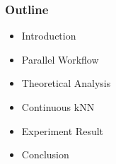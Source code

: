 \begin{comment}
\begin{frame}
\frametitle{DRDS --- Advanced Method --- Naive Bayes Partitioning}
We consider the n partitions from $N_1$ to $N_n$ as n different classes and the already partitioned data as training set. 
The probability that a new point $x$ belongs to $N_i$ is:
\begin{equation}
P(N_i | x) = \frac{P(x | N_i) \cdot P(N_i)}{P(x)}
\end{equation}

And $x$ should be assigned to the partition $N_y$ which has the biggest probability:
\begin{equation}
x \in N_y, \  where \ P(N_y|x) = max\{P(N_1|x), P(N_2|x), ..., P(N_n|x)\}
\end{equation}
\end{frame}

\begin{frame}
\frametitle{Naive Bayes Partitioning}
Partitioning Problem = The calculation of $P(N_i|x)$
\begin{equation}
P(N_i|x) = P(N_i|(l_1(x), l_2(x), ..., l_p(x)))
\end{equation}
According to Bayes' Theorem:
\begin{equation}
= \frac{P( (l_1(x), l_2(x), ..., l_p(x))|N_i )}{P(  l_1(x), l_2(x), ..., l_p(x) )}
\end{equation}
Since $l_1$, $l_2$, ..., $l_p$ are independent, we have:
\begin{equation}
= \frac{ P(l_1(x)|N_i) \cdot P( l_2(x)|N_i ) ...  \cdot P(l_p(x)|N_i)   \cdot P(N_i)}{P(l_1(x)) \cdot P(l_2(x)) ... \cdot P(l_p(x))   }
\end{equation}

$P(l_j(x)|N_i)$ is the probability of the appearance of $l_j(x)$ on $N_i$, and this probability is decided by the distribution of data on $N_i$.
\end{frame}
\end{comment}


\begin{frame}
\frametitle{Outline}
	\begin{itemize}
		\item Introduction
		\item Parallel Workflow
		\item Theoretical Analysis
		\item Continuous kNN
		\item Experiment Result
		\item \textcolor{blue!20}{Conclusion}
	\end{itemize}
\end{frame}

